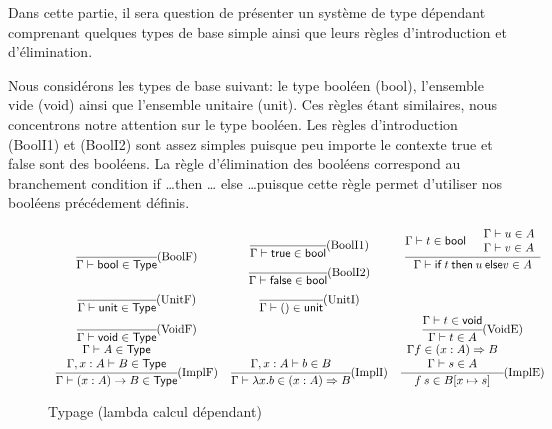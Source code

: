 \documentclass{article}
\theoremstyle{definition}
\theoremstyle{remark}
\begin{document}
Dans cette partie, il sera question de présenter un système de type
dépendant comprenant quelques types de base simple \citep{hottbook,thompson:types-fp}ainsi que leurs règles d'introduction et d'élimination. 

Nous considérons les types de base suivant: le type booléen
(\textsf{bool}), l'ensemble vide (\textsf{void}) ainsi que l'ensemble
unitaire (\textsf{unit}). Ces règles étant
similaires, nous concentrons notre attention sur le type booléen. Les
règles d'introduction (BoolI1) et (BoolI2) sont assez simples puisque
peu importe le contexte \textsf{true} et \textsf{false} sont des
booléens.  La règle d'élimination des booléens correspond au
branchement condition \textsf{if} \ldots \textsf{then} \ldots
\textsf{else} \ldots puisque cette règle permet d'utiliser nos
booléens précédement définis.

\begin{figure}
  \[\begin{array}{ccc}
  \cfrac{}
        {\Gamma\vdash \mathsf{bool} \in \mathsf{Type}}\mbox{(BoolF)}
  & 
  \begin{array}{c}
  \cfrac{}
        {\Gamma \vdash \mathsf{true} \in \mathsf{bool}}\mbox{(BoolI1)}
  \\
  \cfrac{}
        {\Gamma \vdash \mathsf{false} \in \mathsf{bool}}\mbox{(BoolI2)}
  \end{array}
  &
  \cfrac{\Gamma \vdash t \in \mathsf{bool} \quad 
         \begin{array}{l}
          \Gamma \vdash u \in A \\
          \Gamma \vdash v \in A 
         \end{array}}
        {\Gamma \vdash \mathsf{if}\: t\: \mathsf{then}\: u\: \mathsf{else} v \in A}
  \\
  \cfrac{}
        {\Gamma\vdash \mathsf{unit} \in \mathsf{Type}}\mbox{(UnitF)}
  & 
  \cfrac{}
        {\Gamma\vdash () \in \mathsf{unit}}\mbox{(UnitI)}
  \\
  \cfrac{}
        {\Gamma\vdash \mathsf{void} \in \mathsf{Type}}\mbox{(VoidF)}
  &
  &
  \cfrac{\Gamma\vdash t \in \mathsf{void}}
        {\Gamma\vdash t \in A}\mbox{(VoidE)}
  \\
  \cfrac{\begin{array}{c}
          \Gamma\vdash A \in \mathsf{Type} \\
          \Gamma, x : A \vdash B \in \mathsf{Type}
         \end{array}}
        {\Gamma \vdash (x:A) \rightarrow B \in \mathsf{Type}} 
        \mbox{(ImplF)}
  &
  \cfrac{\Gamma, x:A \vdash b\in B}
        {\Gamma \vdash \lambda x. b \in (x:A) \Rightarrow B}
        \mbox{(ImplI)}
  & 
  \cfrac{\begin{array}{c}
          \Gamma f \in (x:A)\Rightarrow B \\
          \Gamma \vdash s \in A
         \end{array}}
        {f\: s \in B[x \mapsto s]}
        \mbox{(ImplE)}
  \end{array}\]
  \caption{Typage (lambda calcul dépendant)}
  \label{fig:typage-dependant}
\end{figure}
\end{document}
